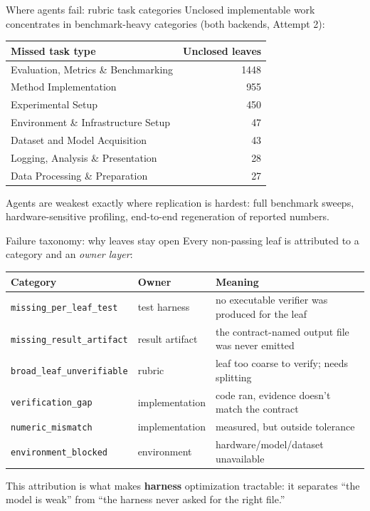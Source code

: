 \documentclass[aspectratio=169]{beamer}
\begin{document}
\begin{frame}{Where agents fail: rubric task categories}
  Unclosed implementable work concentrates in benchmark-heavy categories (both backends, Attempt 2):
  \vspace{0.4em}
  \begin{table}
    \small
    \begin{tabular}{lr}
      \toprule
      Missed task type & Unclosed leaves \\
      \midrule
      Evaluation, Metrics \& Benchmarking & 1448 \\
      Method Implementation & 955 \\
      Experimental Setup & 450 \\
      Environment \& Infrastructure Setup & 47 \\
      Dataset and Model Acquisition & 43 \\
      Logging, Analysis \& Presentation & 28 \\
      Data Processing \& Preparation & 27 \\
      \bottomrule
    \end{tabular}
  \end{table}
  \vspace{0.4em}
  Agents are weakest exactly where replication is hardest: full benchmark sweeps,
  hardware-sensitive profiling, end-to-end regeneration of reported numbers.
\end{frame}

\begin{frame}{Failure taxonomy: why leaves stay open}
  Every non-passing leaf is attributed to a category and an \emph{owner layer}:
  \vspace{0.4em}
  \begin{table}
    \small
    \begin{tabular}{llp{5.2cm}}
      \toprule
      Category & Owner & Meaning \\
      \midrule
      \texttt{missing\_per\_leaf\_test} & test harness & no executable verifier was produced for the leaf \\
      \texttt{missing\_result\_artifact} & result artifact & the contract-named output file was never emitted \\
      \texttt{broad\_leaf\_unverifiable} & rubric & leaf too coarse to verify; needs splitting \\
      \texttt{verification\_gap} & implementation & code ran, evidence doesn't match the contract \\
      \texttt{numeric\_mismatch} & implementation & measured, but outside tolerance \\
      \texttt{environment\_blocked} & environment & hardware/model/dataset unavailable \\
      \bottomrule
    \end{tabular}
  \end{table}
  \vspace{0.3em}
  This attribution is what makes \textbf{harness} optimization tractable: it separates
  ``the model is weak'' from ``the harness never asked for the right file.''
\end{frame}
\end{document}

